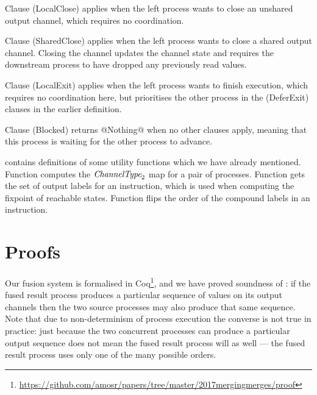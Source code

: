 Clause (LocalClose) applies when the left process wants to close an unshared output channel, which requires no coordination.

Clause (SharedClose) applies when the left process wants to close a shared output channel.
Closing the channel updates the channel state and requires the downstream process to have dropped any previously read values.

Clause (LocalExit) applies when the left process wants to finish execution, which requires no coordination here, but prioritises the other process in the (DeferExit) clauses in the earlier  definition.

Clause (Blocked) returns @Nothing@ when no other clauses apply, meaning that this process is waiting for the other process to advance.


\smallskip



 contains definitions of some utility functions which we have already mentioned.
Function  computes the $\textit{ChannelType}_2$ map for a pair of processes.
Function  gets the set of output labels for an instruction, which is used when computing the fixpoint of reachable states.
Function  flips the order of the compound labels in an instruction.



% 






\section{Proofs}
\label{s:Proofs}

Our fusion system is formalised in Coq\footnote{\url{https://github.com/amosr/papers/tree/master/2017mergingmerges/proof}}, and we have proved soundness of : if the fused result process produces a particular sequence of values on its output channels then the two source processes may also produce that same sequence. Note that due to non-determinism of process execution the converse is not true in practice: just because the two concurrent processes can produce a particular output sequence does not mean the fused result process will as well --- the fused result process uses only one of the many possible orders.


